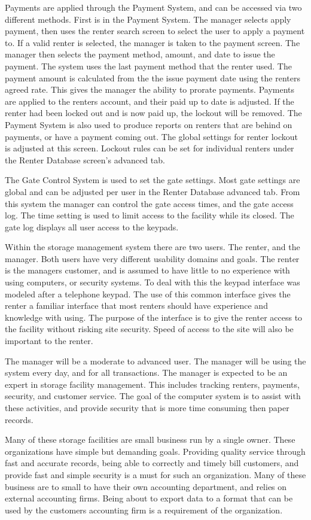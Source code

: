 \documentclass[a4paper,10pt]{article}
\begin{document}
Payments are applied through the Payment System, and can be accessed via two different methods.  First
is in the Payment System.  The manager selects apply payment, then uses the renter search screen to 
select the user to apply a payment to.  If a valid renter is selected, the manager is taken to the payment
screen.  The manager then selects the payment method, amount, and date to issue the payment.  The system
uses the last payment method that the renter used.  The payment amount is calculated from the the issue
payment date using the renters agreed rate.  This gives the manager the ability to prorate payments.
Payments are applied to the renters account, and their paid up to date is adjusted.  If the renter had
been locked out and is now paid up, the lockout will be removed.  The Payment System is also used to
produce reports on renters that are behind on payments, or have a payment coming out.  The global 
settings for renter lockout is adjusted at this screen.  Lockout rules can be set for individual renters
under the Renter Database screen's advanced tab.
 
The Gate Control System is used to set the gate settings.  Most gate settings are global and can be
adjusted per user in the Renter Database advanced tab.  From this system the manager can control the
gate access times, and the gate access log.  The time setting is used to limit access to the facility 
while its closed.  The gate log displays all user access to the keypads.    

Within the storage management system there are two users.  The renter, and the manager.  Both users
have very different usability domains and goals.  The renter is the managers customer, and is assumed
to have little to no experience with using computers, or security systems.  To deal with this the keypad 
interface was modeled after a telephone keypad.  The use of this common interface gives the renter a 
familiar interface that most renters should have experience and knowledge with using.  The purpose of 
the interface is to give the renter access to the facility without risking site security.  Speed of
access to the site will also be important to the renter.     

The manager will be a moderate to advanced user.  The manager will be using the system every day, and
for all transactions.  The manager is expected to be an expert in storage facility management.  This 
includes tracking renters, payments, security, and customer service.  The goal of the computer system
is to assist with these activities, and provide security that is more time consuming then paper records.



Many of these storage facilities are small business run by a single owner.  These organizations have
simple but demanding goals.  Providing quality service through fast and accurate records, being able 
to correctly and timely bill customers, and provide fast and simple security is a must for such an
organization.  Many of these business are to small to have their own accounting department, and relies
on external accounting firms.  Being about to export data to a format that can be used by the customers
accounting firm is a requirement of the organization.  
 
\end{document}
